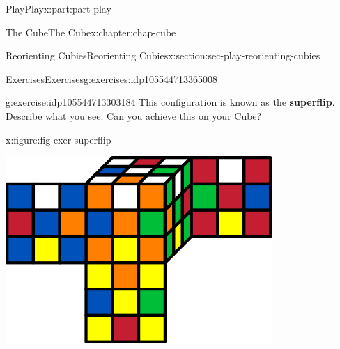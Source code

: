 \documentclass[oneside,10pt,]{book}
\newcommand{\terminology}[1]{\textbf{#1}}
\numberwithin{equation}{section}
\begin{document}
\begin{partptx}{Play}{}{Play}{}{}{x:part:part-play}
\begin{chapterptx}{The Cube}{}{The Cube}{}{}{x:chapter:chap-cube}
\begin{sectionptx}{Reorienting Cubies}{}{Reorienting Cubies}{}{}{x:section:sec-play-reorienting-cubies}
\begin{exercises-subsection-numberless}{Exercises}{}{Exercises}{}{}{g:exercises:idp105544713365008}
\begin{divisionexercise}{4}{}{}{g:exercise:idp105544713303184}
This configuration is known as the \terminology{superflip}. Describe what you see. Can you achieve this on your Cube?%
\begin{figureptx}{}{x:figure:fig-exer-superflip}{}%
\begin{image}{0.25}{0.5}{0.25}%
\includegraphics[width=\linewidth]{./images/superflip.svg}
\end{image}%
\tcblower
\end{figureptx}%
\end{divisionexercise}%
\end{exercises-subsection-numberless}
\end{sectionptx}
\end{chapterptx}
\end{partptx}
%
%
\typeout{************************************************}
\typeout{************************************************}
%
\end{document}

